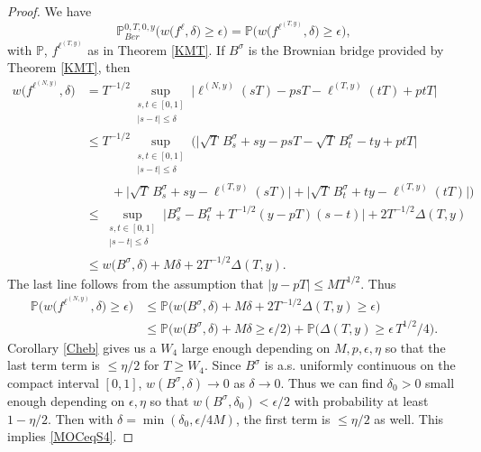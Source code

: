 \begin{proof}
	We have
	\[
	\mathbb{P}^{0,T,0,y}_{Ber}\Big( w\big({f^\ell},\delta\big) \geq \epsilon \Big) = \mathbb{P}\Big( w\big(f^{\ell^{(T,y)}},\delta\big) \geq \epsilon \Big),
	\]
	with $\mathbb{P}$, $f^{\ell^{(T,y)}}$ as in Theorem \ref{KMT}. If $B^\sigma$ is the Brownian bridge provided by Theorem \ref{KMT}, then
	\begin{align*}
	w\big(f^{\ell^{(N,y)}},\delta\big) &= T^{-1/2} \sup_{\substack{s,t \in [0,1]\\ |s-t| \leq \delta}} \Big| \ell^{(N,y)}(sT) - psT - \ell^{(T,y)}(tT) + ptT \Big|\\
	&\leq T^{-1/2} \sup_{\substack{s,t \in [0,1]\\ |s-t| \leq \delta}} \Big(\big| \sqrt{T}\,B^\sigma_s + sy - psT - \sqrt{T}\,B^\sigma_t - ty + ptT \big|\\
	&\qquad + \big|\sqrt{T}\,B^\sigma_s + sy - \ell^{(T,y)}(sT)\big| + \big|\sqrt{T}\,B^\sigma_t + ty - \ell^{(T,y)}(tT)\big|\Big)\\
	&\leq \sup_{\substack{s,t \in [0,1]\\ |s-t| \leq \delta}} \Big| B^\sigma_s - B^\sigma_t + T^{-1/2} (y-pT)(s-t)\Big| + 2T^{-1/2}\Delta(T,y)\\
	&\leq w\big(B^\sigma,\delta\big) + M\delta + 2T^{-1/2}\Delta(T,y).
	\end{align*}
	The last line follows from the assumption that $|y-pT|\leq MT^{1/2}$. Thus
	\begin{align*}
	\mathbb{P}\Big( w\big(f^{\ell^{(N,y)}},\delta\big) \geq \epsilon \Big) &\leq \mathbb{P}\Big( w\big(B^\sigma,\delta\big) + M\delta + 2T^{-1/2}\Delta(T,y) \geq \epsilon \Big)\\
	&\leq \mathbb{P}\Big( w\big(B^\sigma,\delta\big) + M\delta \geq \epsilon/2 \Big) + \mathbb{P}\Big( \Delta(T,y) \geq \epsilon\, T^{1/2}/4 \Big).
	\end{align*}
	Corollary \ref{Cheb} gives us a $W_4$ large enough depending on $M,p,\epsilon,\eta$ so that the last term term is $\leq\eta/2$ for $T\geq W_4$. Since $B^\sigma$ is a.s. uniformly continuous on the compact interval $[0,1]$, $w(B^\sigma,\delta) \to 0$ as $\delta\to 0$. Thus we can find $\delta_0>0$ small enough depending on $\epsilon,\eta$ so that $w(B^\sigma,\delta_0) < \epsilon/2$ with probability at least $1-\eta/2$. Then with $\delta = \min(\delta_0, \epsilon/4M)$, the first term is $\leq\eta/2$ as well. This implies \eqref{MOCeqS4}.
\end{proof}


%

